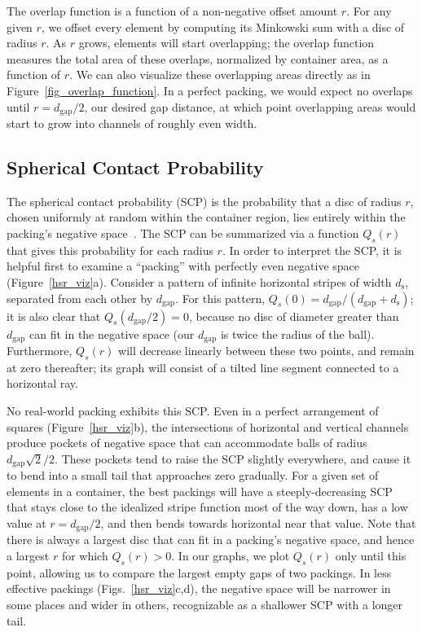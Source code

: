 The overlap function is a function of a non-negative offset amount
$r$.  For any given $r$, we offset every element by computing its Minkowski
sum with a disc of radius $r$.  As $r$ grows, elements will start overlapping;
the overlap function measures the total area of these overlaps, normalized
by container area, as a function of $r$.  We can also visualize these 
overlapping areas directly as in Figure~\ref{fig_overlap_function}.  In a 
perfect packing, we would expect no overlaps until $r=d_\mathrm{gap}/2$,
our desired gap distance, at which point overlapping areas would start to
grow into channels of roughly even width.

\subsection{Spherical Contact Probability}

The spherical contact probability (SCP) is the probability that a 
disc of radius $r$, chosen
uniformly at random within the container region, lies entirely within the 
packing's negative space~\cite{Chiu2013}.
The SCP can be summarized via a function $Q_s(r)$ that gives this 
probability for each radius $r$.
In order to interpret the SCP, it is helpful first to
examine a ``packing'' with perfectly even negative space (Figure~\ref{hsr_viz}a).
Consider a pattern of infinite horizontal stripes of width $d_\mathrm{s}$,
separated from each other by $d_\mathrm{gap}$.  For this pattern,
$Q_s(0)=d_\mathrm{gap}/(d_\mathrm{gap}+d_\mathrm{s})$; it is also
clear that $Q_s(d_\mathrm{gap}/2)=0$, because no disc of diameter greater
than $d_\mathrm{gap}$ can fit in the negative space
(our $d_\mathrm{gap}$ is twice the radius of the ball).
Furthermore,
$Q_s(r)$ will decrease linearly between these two points, and remain
at zero thereafter; its graph will consist of a tilted line segment
connected to a horizontal ray.

No real-world packing exhibits this SCP.  Even in a perfect arrangement
of squares (Figure~\ref{hsr_viz}b), the intersections of horizontal and
vertical channels
produce pockets of negative space that can accommodate balls of
radius $d_\mathrm{gap}\sqrt{2}/2$.  These pockets tend to raise the SCP
slightly everywhere, and cause it to bend into a small tail that
approaches zero gradually.
For a given set of elements in a container, the best packings will
have a steeply-decreasing SCP that stays close to the idealized stripe function most
of the way down, has a low value at $r=d_\mathrm{gap}/2$,
and then bends towards horizontal near that value.
Note that there is always a largest disc that can fit in a packing's
negative space, and hence a largest $r$ for which $Q_s(r)>0$.  
In our graphs, we plot $Q_s(r)$ only until this point, allowing us
to compare the largest empty gaps of two packings.
In less effective packings (Figs.~\ref{hsr_viz}c,d), the negative space 
will be narrower in
some places and wider in others, recognizable as a shallower SCP
with a longer tail.

